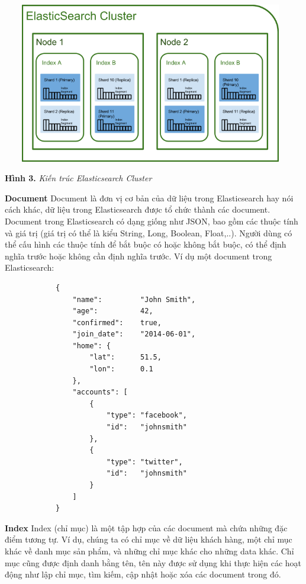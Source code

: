 \vspace{0.3cm}
\begin{center}
\includegraphics[width=13cm, height=7cm]{images/image_05.png}
\end{center}
\begin{center}
\vspace{0.1cm}
\textbf{Hình 3.} \textit{Kiến trúc Elasticsearch Cluster}    
\end{center}
\vspace{0.3cm}
\textbf{Document} Document là đơn vị cơ bản của dữ liệu trong Elasticsearch hay nói cách khác, dữ liệu trong Elasticsearch được tổ chức thành các document. Document trong Elasticsearch có dạng giống như JSON, bao gồm các thuộc tính và giá trị (giá trị có thể là kiểu String, Long, Boolean, Float,..). Người dùng có thể cấu hình các thuộc tính để bắt buộc có hoặc không bắt buộc, có thể định nghĩa trước hoặc không cần định nghĩa trước. Ví dụ một document trong Elasticsearch:
\begin{center}
\begin{lstlisting}
            {
                "name":         "John Smith",
                "age":          42,
                "confirmed":    true,
                "join_date":    "2014-06-01",
                "home": {
                    "lat":      51.5,
                    "lon":      0.1
                },
                "accounts": [
                    {
                        "type": "facebook",
                        "id":   "johnsmith"
                    },
                    {
                        "type": "twitter",
                        "id":   "johnsmith"
                    }
                ]
            }
\end{lstlisting}
\end{center}
\textbf{Index} Index (chỉ mục) là một tập hợp của các document mà chứa những đặc điểm tương tự. Ví dụ, chúng ta có chỉ mục về dữ liệu khách hàng, một chỉ mục khác về danh mục sản phẩm, và những chỉ mục khác cho những data khác. Chỉ mục cũng được định danh bằng tên, tên này được sử dụng khi thực hiện các hoạt động như lập chỉ mục, tìm kiếm, cập nhật hoặc xóa các document trong đó.

